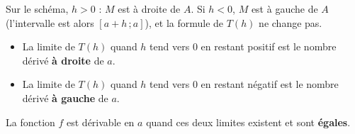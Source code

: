\documentclass[11pt,a4paper]{article}
\makeatletter
\newcommand{\lycee@intff}[2]{\left[#1\,;#2\right]}
\providecommand{\intff}{\lycee@intff}%
\makeatother
\begin{document}
\begin{remarquebox}
Sur le schéma, $h>0$ : $M$ est à droite de $A$. Si $h<0$, $M$ est à gauche de $A$
(l'intervalle est alors $\intff{a+h}{a}$), et la formule de $T(h)$ ne change pas.
\begin{itemize}
  \item La limite de $T(h)$ quand $h$ tend vers $0$ en restant positif est le nombre
        dérivé \textbf{à droite} de $a$.
  \item La limite de $T(h)$ quand $h$ tend vers $0$ en restant négatif est le nombre
        dérivé \textbf{à gauche} de $a$.
\end{itemize}
La fonction $f$ est dérivable en $a$ quand ces deux limites existent et sont \textbf{égales}.
\end{remarquebox}
\end{document}
